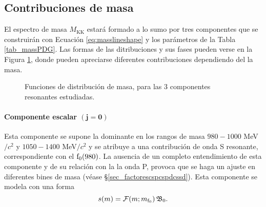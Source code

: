 \subsection{Contribuciones de masa}

El espectro de masa $M_{\text{KK}}$ estará formado a lo sumo por tres componentes que se construirán con Ecuación \ref{eq:masslineshape} y los parámetros de la Tabla \ref{tab_massPDG}. Las formas de las ditribuciones y sus fases pueden verse en la Figura \ref{fig:masslineshape}, donde pueden apreciarse diferentes contribuciones dependiendo del la masa.

\begin{figure}[H]
\centering
{} \hfill
{} \hfill
{} \hfill
{} \hfill
\caption{Funciones de distribución de masa, para las 3 componentes resonantes estudiadas.}  \label{fig:masslineshape}
\end{figure}

\paragraph{Componente escalar $\bm{(j=0)}$}
Esta componente se supone la dominante en los rangos de masa $980- 1000$ MeV$/c^2$ y $1050-1400$ MeV$/c^2$ y se atribuye a una contribución de onda S resonante, correspondiente con el $\mathrm{f}_0(980)$. %
La ausencia de un completo entendimiento de esta componente y de su relación con la la onda P, provoca que se haga un ajuste en diferentes bines de masa (véase \S \ref{sec_factorescspcspdcssd}). Esta componente se modela con una forma 
\begin{equation}
	s(m) = \mathcal{F}(m;m_{\mathrm{f}_0}) \, \mathfrak{B}_0.
\end{equation}

